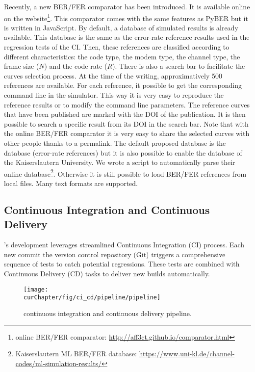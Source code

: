 Recently, a new BER/FER comparator has been introduced. It is available online
on the \AFFECT website\footnote{\AFFECT online BER/FER comparator:
\url{http://aff3ct.github.io/comparator.html}}. This comparator comes with the
same features as PyBER but it is written in JavaScript. By default, a database
of \AFFECT simulated results is already available. This database is the same as
the error-rate reference results used in the regression tests of the CI.
Then, these references are classified according to different characteristics:
the code type, the modem type, the channel type, the frame size ($N$) and the
code rate ($R$). There is also a search bar to facilitate the curves selection
process. At the time of the writing, approximatively 500 references are
available. For each reference, it possible to get the corresponding command line
in the \AFFECT simulator. This way it is very easy to reproduce the reference
results or to modify the command line parameters. The reference curves that have
been published are marked with the DOI of the publication. It is then possible
to search a specific result from its DOI in the search bar. Note that with the
online BER/FER comparator it is very easy to share the selected curves with
other people thanks to a permalink. The default proposed database is the
\AFFECT database (error-rate references) but it is also possible to enable the
database of the Kaiserslautern University. We wrote a script to automatically
parse their online database\footnote{Kaiserslautern ML BER/FER database:
\url{https://www.uni-kl.de/channel-codes/ml-simulation-results/}}. Otherwise it
is still possible to load BER/FER references from local files. Many text formats
are supported.

\subsection{Continuous Integration and Continuous Delivery}
\label{sec:aff3ct_ci_cd}

\AFFECT's development leverages streamlined Continuous Integration (CI) process.
Each new commit the version control repository (Git) triggers a comprehensive
sequence of tests to catch potential regressions. These tests are combined with
Continuous Delivery (CD) tasks to deliver new \AFFECT builds automatically.

\begin{figure}[htp]
  \centering
  \texttt{[image: \\curChapter/fig/ci\_cd/pipeline/pipeline]}
  \caption{\AFFECT continuous integration and continuous delivery pipeline.}
  \label{fig:aff3ct_ci_cd_pipeline}
\end{figure}

